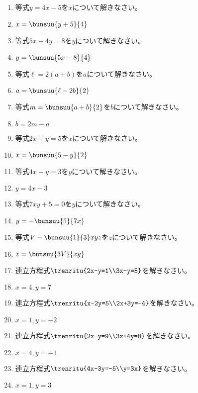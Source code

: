 \documentclass[uplatex,a4j,11pt]{jsreport}
\begin{document}
\begin{multicols}{2}
\begin{enumerate}
    \item 等式\quad$y=4x-5$\quad を\quad$x$\quad について解きなさい。%
    \item $x=\bunsuu{y+5}{4}$
    \item 等式\quad$5x-4y=8$\quad を\quad$y$\quad について解きなさい。%
    \item $y=\bunsuu{5x-8}{4}$
    \item 等式\quad$\ell=2(a+b)$\quad を\quad$a$\quad について解きなさい。%
    \item $a=\bunsuu{\ell-2b}{2}$
    \item 等式\quad$m=\bunsuu{a+b}{2}$\quad を\quad$b$\quad について解きなさい。%
    \item $b=2m-a$
    \item 等式\quad$2x+y=5$\quad を\quad$x$\quad について解きなさい。%
    \item $x=\bunsuu{5-y}{2}$
    \item 等式\quad$4x-y=3$\quad を\quad$y$\quad について解きなさい。%
    \item $y=4x-3$
    \item 等式\quad$7xy+5 = 0$\quad を\quad$y$\quad について解きなさい。%
    \item $y=-\bunsuu{5}{7x}$
    \item 等式\quad$V-\bunsuu{1}{3}xyz$\quad を\quad$z$\quad について解きなさい。%
    \item $z=\bunsuu{3V}{xy}$
    \item 連立方程式\quad$\trenritu{2x-y=1\\3x-y=5}$\quad を解きなさい。%
    \item $x=4, y=7$
    \item 連立方程式\quad$\trenritu{x-2y=5\\2x+3y=-4}$\quad を解きなさい。%
    \item $x=1, y=-2$
    \item 連立方程式\quad$\trenritu{2x-y=9\\3x+4y=8}$\quad を解きなさい。%
    \item $x=4, y=-1$
    \item 連立方程式\quad$\trenritu{4x-3y=-5\\y=3x}$\quad を解きなさい。%
    \item $x=1, y=3$

\end{enumerate}
\end{multicols}
\end{document}
